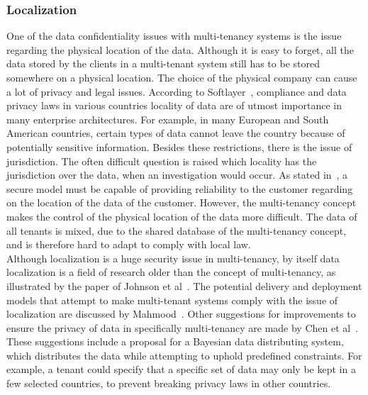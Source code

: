 \subsubsection{Localization}
One of the data confidentiality issues with multi-tenancy systems is the issue regarding the physical location of the data. 
Although it is easy to forget, all the data stored by the clients in a multi-tenant system still has to be stored somewhere on a physical location. 
The choice of the physical company can cause a lot of privacy and legal issues. 
According to Softlayer~\cite{Softlayer2009Security}, compliance and data privacy laws in various countries locality of data are of utmost importance in many enterprise architectures. 
For example, in many European and South American countries, certain types of data cannot leave the country because of potentially sensitive information.
Besides these restrictions, there is the issue of jurisdiction.
The often difficult question is raised which locality has the jurisdiction over the data, when an investigation would occur.
As stated in~\cite{Subashini2011Security}, a secure model must be capable of providing reliability to the customer regarding on the location of the data of the customer.
However, the multi-tenancy concept makes the control of the physical location of the data more difficult. The data of all tenants is mixed, due to the shared database of the multi-tenancy concept, and is therefore hard to adapt to comply with local law.\\

Although localization is a huge security issue in multi-tenancy, by itself data localization is a field of research older than the concept of multi-tenancy, as illustrated by the paper of Johnson et al~\cite{Johnson1996Law}. 
The potential delivery and deployment models that attempt to make multi-tenant systems comply with the issue of localization are discussed by Mahmood~\cite{Mahmood2011Security}.
Other suggestions for improvements to ensure the privacy of data in specifically multi-tenancy are made by Chen et al~\cite{Chen2012Security}. These suggestions include a proposal for a Bayesian data distributing system, which distributes the data while attempting to uphold predefined constraints. For example, a tenant could specify that a specific set of data may only be kept in a few selected countries, to prevent breaking privacy laws in other countries. 

